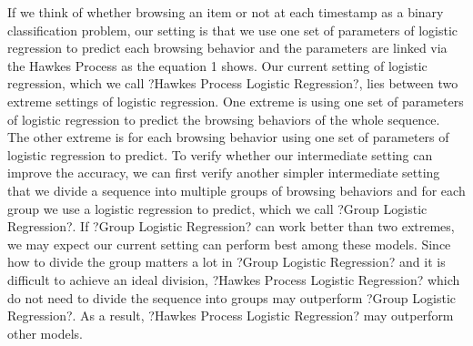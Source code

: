 \documentclass[11pt]{article}
\begin{document}
If we think of whether browsing an item or not at each timestamp as a binary classification problem, our setting is that we use one set of parameters of logistic regression to predict each browsing behavior and the parameters are linked via the Hawkes Process as the equation 1 shows. Our current setting of logistic regression, which we call ?Hawkes Process Logistic Regression?, lies between two extreme settings of logistic regression. One extreme is using one set of parameters of logistic regression to predict the browsing behaviors of the whole sequence. The other extreme is for each browsing behavior using one set of parameters of logistic regression to predict. To verify whether our intermediate setting can improve the accuracy, we can first verify another simpler intermediate setting that we divide a sequence into multiple groups of browsing behaviors and for each group we use a logistic regression to predict, which we call ?Group Logistic Regression?. If ?Group Logistic Regression? can work better than two extremes, we may expect our current setting can perform best among these models. Since how to divide the group matters a lot in ?Group Logistic Regression? and it is difficult to achieve an ideal division, ?Hawkes Process Logistic Regression? which do not need to divide the sequence into groups may outperform ?Group Logistic Regression?. As a result, ?Hawkes Process Logistic Regression? may outperform other models.




\end{document}
